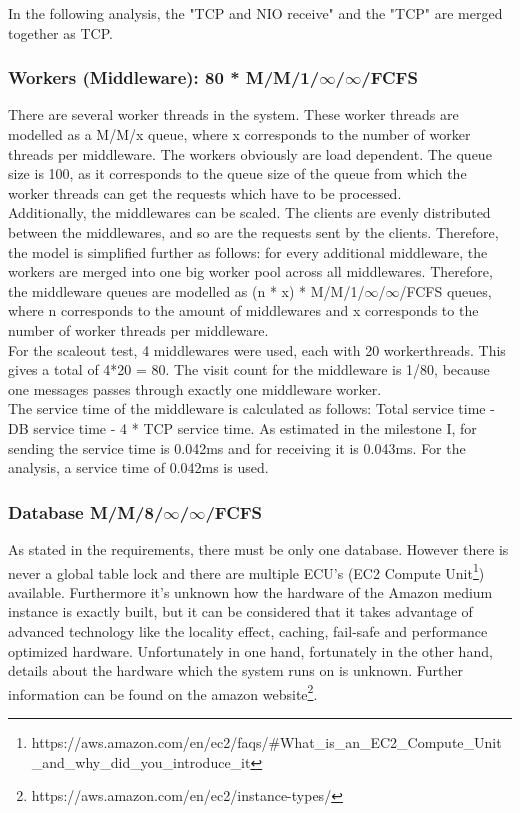 \documentclass[a4paper]{article}
\begin{document}
{\noindent In the following analysis, the "TCP and NIO receive" and the "TCP" are merged together as TCP.


\subsubsection{Workers (Middleware): 80 * M/M/1/$\infty$/$\infty$/FCFS}

There are several worker threads in the system. These worker threads are modelled as a M/M/x queue, where x corresponds to the number of worker threads per middleware. The workers obviously are load dependent. The queue size is 100, as it corresponds to the queue size of the queue from which the worker threads can get the requests which have to be processed.\\

\noindent Additionally, the middlewares can be scaled. The clients are evenly distributed between the middlewares, and so are the requests sent by the clients. Therefore, the model is simplified further as follows: for every additional middleware, the workers are merged into one big worker pool across all middlewares. Therefore, the middleware queues are modelled as (n * x) * M/M/1/$\infty$/$\infty$/FCFS queues, where n corresponds to the amount of middlewares and x corresponds to the number of worker threads per middleware.\\

For the scaleout test, 4 middlewares were used, each with 20 workerthreads. This gives a total of 4*20 = 80. The visit count for the middleware is 1/80, because one messages passes through exactly one middleware worker.\\

The service time of the middleware is calculated as follows:
Total service time - DB service time - 4 * TCP service time. As estimated in the milestone I, for sending the service time is 0.042ms and for receiving it is 0.043ms. For the analysis, a service time of 0.042ms is used.\\


\subsubsection{Database M/M/8/$\infty$/$\infty$/FCFS}

As stated in the requirements, there must be only one database. However there is never a global table lock and there are multiple ECU's (EC2 Compute Unit\footnote{https://aws.amazon.com/en/ec2/faqs/\#What\_is\_an\_EC2\_Compute\_Unit\_and\_why\_did\_you\_introduce\_it})  available. Furthermore it's unknown how the hardware of the Amazon medium instance is exactly built, but it can be considered that it takes advantage of advanced technology like the locality effect, caching, fail-safe and performance optimized hardware. Unfortunately in one hand, fortunately in the other hand, details about the hardware which the system runs on is unknown. Further information can be found on the amazon website\footnote{https://aws.amazon.com/en/ec2/instance-types/}.\\

}
\end{document}

